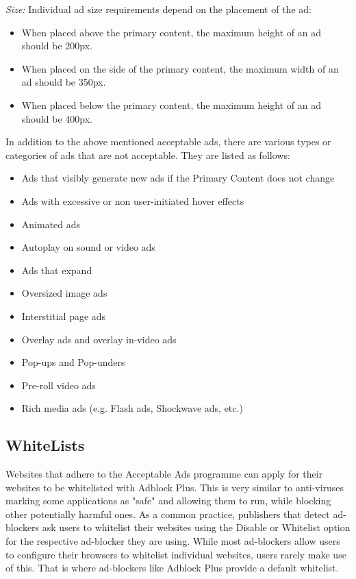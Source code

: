 \documentclass[runningheads,a4paper]{llncs}
\begin{document}
\textit{Size:} Individual ad size requirements depend on the placement of the ad:\begin{itemize}
\item When placed above the primary content, the maximum height of an ad should be 200px.
\item When placed on the side of the primary content, the maximum width of an ad should be 350px.
\item When placed below the primary content, the maximum height of an ad should be 400px.
\end{itemize}

In addition to the above mentioned acceptable ads, there are various types or categories of ads that are not acceptable. They are listed as follows:
\begin{itemize}
\item Ads that visibly generate new ads if the Primary Content does not change
\item Ads with excessive or non user-initiated hover effects
\item Animated ads
\item Autoplay on sound or video ads
\item Ads that expand
\item Oversized image ads
\item Interstitial page ads
\item Overlay ads and overlay in-video ads
\item Pop-ups and Pop-unders
\item Pre-roll video ads
\item Rich media ads (e.g. Flash ads, Shockwave ads, etc.)
\end{itemize}

\subsection{WhiteLists}
Websites that adhere to the Acceptable Ads programme can apply for their websites to be whitelisted with Adblock Plus. This is very similar to anti-viruses marking some applications as "safe" and allowing them to run, while blocking other potentially harmful ones. As a common practice, publishers that detect ad-blockers ask users to whitelist their websites using the Disable or Whitelist option for the respective ad-blocker they are using. While most ad-blockers allow users to configure their browsers to whitelist individual websites, users rarely make use of this. That is where ad-blockers like Adblock Plus provide a default whitelist.
\end{document}
